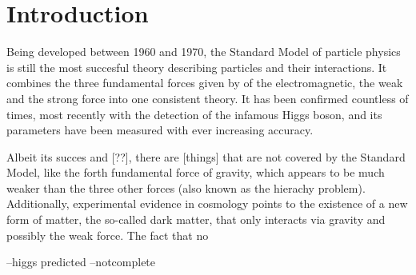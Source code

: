 \chapter*{Introduction}
Being developed between 1960 and 1970, the Standard Model of particle physics is still the most succesful theory describing particles and their interactions. It combines the three fundamental forces given by of the electromagnetic, the weak and the strong force into one consistent theory. It has been confirmed countless of times, most recently with the detection of the infamous Higgs boson, and its parameters have been measured with ever increasing accuracy. 

Albeit its succes and [??], there are [things] that are not covered by the Standard Model, like the forth fundamental force of gravity, which appears to be much weaker than the three other forces (also known as the hierachy problem). Additionally, experimental evidence in cosmology points to the existence of a new form of matter, the so-called dark matter, that only interacts via gravity and possibly the weak force. 
The fact that no 


--higgs predicted --notcomplete

